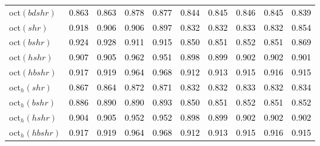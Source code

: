 \begin{tabular}[t]{>{\centering\arraybackslash}m{2.5cm}ccccccccc}
oct$(bdshr)$ & \textcolor{black}{0.863} & \textcolor{black}{0.863} & \textcolor{black}{0.878} & \textcolor{black}{0.877} & \textcolor{black}{0.844} & \textcolor{black}{0.845} & \textcolor{black}{0.846} & \textcolor{black}{0.845} & \textcolor{black}{0.839}\\
oct$(shr)$ & \textcolor{black}{0.918} & \textcolor{black}{0.906} & \textcolor{black}{0.906} & \textcolor{black}{0.897} & \textcolor{black}{0.832} & \textcolor{black}{0.832} & \textcolor{black}{0.833} & \textcolor{black}{0.832} & \textcolor{black}{0.854}\\
oct$(bshr)$ & \textcolor{black}{0.924} & \textcolor{black}{0.928} & \textcolor{black}{0.911} & \textcolor{black}{0.915} & \textcolor{black}{0.850} & \textcolor{black}{0.851} & \textcolor{black}{0.852} & \textcolor{black}{0.851} & \textcolor{black}{0.869}\\
oct$(hshr)$ & \textcolor{black}{0.907} & \textcolor{black}{0.905} & \textcolor{black}{0.962} & \textcolor{black}{0.951} & \textcolor{black}{0.898} & \textcolor{black}{0.899} & \textcolor{black}{0.902} & \textcolor{black}{0.902} & \textcolor{black}{0.901}\\
oct$(hbshr)$ & \textcolor{black}{0.917} & \textcolor{black}{0.919} & \textcolor{black}{0.964} & \textcolor{black}{0.968} & \textcolor{black}{0.912} & \textcolor{black}{0.913} & \textcolor{black}{0.915} & \textcolor{black}{0.916} & \textcolor{black}{0.915}\\
oct$_h(shr)$ & \textcolor{black}{0.867} & \textcolor{black}{0.864} & \textcolor{black}{0.872} & \textcolor{black}{0.871} & \textcolor{black}{0.832} & \textcolor{black}{0.832} & \textcolor{black}{0.833} & \textcolor{black}{0.832} & \textcolor{black}{0.834}\\
oct$_h(bshr)$ & \textcolor{black}{0.886} & \textcolor{black}{0.890} & \textcolor{black}{0.890} & \textcolor{black}{0.893} & \textcolor{black}{0.850} & \textcolor{black}{0.851} & \textcolor{black}{0.852} & \textcolor{black}{0.851} & \textcolor{black}{0.852}\\
oct$_h(hshr)$ & \textcolor{black}{0.904} & \textcolor{black}{0.905} & \textcolor{black}{0.952} & \textcolor{black}{0.952} & \textcolor{black}{0.898} & \textcolor{black}{0.899} & \textcolor{black}{0.902} & \textcolor{black}{0.902} & \textcolor{black}{0.902}\\
oct$_h(hbshr)$ & \textcolor{black}{0.917} & \textcolor{black}{0.919} & \textcolor{black}{0.964} & \textcolor{black}{0.968} & \textcolor{black}{0.912} & \textcolor{black}{0.913} & \textcolor{black}{0.915} & \textcolor{black}{0.916} & \textcolor{black}{0.915}\\
\bottomrule
\end{tabular}
